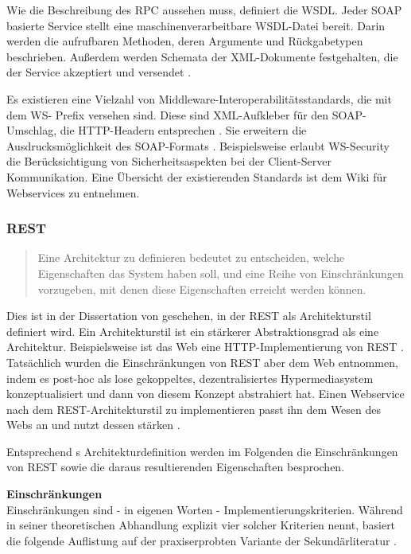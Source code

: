 \documentclass[12pt,a4paper,bibliography=totocnumbered,listof=totoc]{scrartcl}
\begin{document}
Wie die Beschreibung des \ac{RPC} aussehen muss, definiert die \ac{WSDL}. Jeder SOAP basierte Service stellt eine maschinenverarbeitbare \ac{WSDL}-Datei bereit. Darin werden die aufrufbaren Methoden, deren Argumente und Rückgabetypen beschrieben. Außerdem werden Schemata der XML-Dokumente festgehalten, die der Service akzeptiert und versendet \citep{richardson07}.

Es existieren eine Vielzahl von Middleware-Interoperabilitätsstandards, die mit dem \glqq WS-\grqq{} Prefix versehen sind. Diese sind \glqq XML-Aufkleber\grqq{} für den SOAP-Umschlag, die HTTP-Headern entsprechen \citep{richardson07}. Sie erweitern die Ausdrucksmöglichkeit des SOAP-Formats \citep{wilde11}. Beispielsweise erlaubt WS-Security die Berücksichtigung von Sicherheitsaspekten bei der Client-Server Kommunikation. Eine Übersicht der existierenden Standards ist dem Wiki für Webservices \citet{webServiceWiki09} zu entnehmen.

\subsubsection{REST}
\label{subsubsection:REST}
\begin{quote}
\glqq Eine Architektur zu definieren bedeutet zu entscheiden, welche Eigenschaften das System haben soll, und eine Reihe von Einschränkungen vorzugeben, mit denen diese Eigenschaften erreicht werden können.\grqq{} \citep{tilkov11}
\end{quote}

Dies ist in der Dissertation von \citeauthor{fielding00} geschehen, in der REST als Architekturstil definiert wird. Ein Architekturstil ist ein stärkerer Abstraktionsgrad als eine Architektur. Beispielsweise ist das Web eine HTTP-Implementierung von REST \citep{tilkov11}. Tatsächlich wurden die Einschränkungen von REST aber dem Web entnommen, indem \citeauthor{fielding00} es post-hoc als lose gekoppeltes, dezentralisiertes Hypermediasystem konzeptualisiert \citep{wilde11} und dann von diesem Konzept abstrahiert hat. Einen Webservice nach dem REST-Architekturstil zu implementieren passt ihn dem Wesen des Webs an und nutzt dessen stärken \citep{tilkov11}.

Entsprechend \citeauthor{tilkov11}s Architekturdefinition werden im Folgenden die Einschränkungen von REST sowie die daraus resultierenden Eigenschaften besprochen.

\textbf{Einschränkungen}\\
Einschränkungen sind - in eigenen Worten - Implementierungskriterien. Während \citeauthor{fielding00} in seiner theoretischen Abhandlung explizit vier solcher Kriterien nennt, basiert die folgende Auflistung auf der praxiserprobten Variante der Sekundärliteratur \citep{wilde11, tilkov11}.
\end{document}
